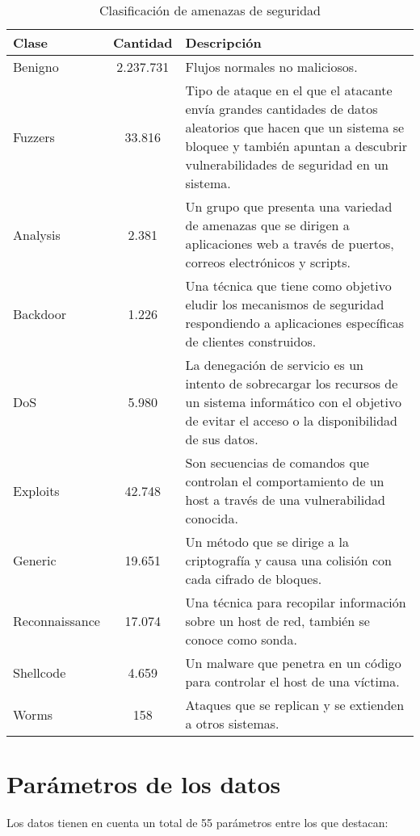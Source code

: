 \begin{table}[H]
\label{tab:attacks-tab}
\begin{tabular}{|l|c|>{\RaggedRight}p{10cm}|} %
\hline
\rowcolor[HTML]{C0C0C0} 
\textbf{Clase} & \textbf{Cantidad} & \textbf{Descripción} \\ \hline
Benigno & 2.237.731 & Flujos normales no maliciosos. \\ \hline
Fuzzers & 33.816 & Tipo de ataque en el que el atacante envía grandes cantidades de datos aleatorios que hacen que un sistema se bloquee y también apuntan a descubrir vulnerabilidades de seguridad en un sistema. \\ \hline
Analysis & 2.381 & Un grupo que presenta una variedad de amenazas que se dirigen a aplicaciones web a través de puertos, correos electrónicos y scripts. \\ \hline
Backdoor & 1.226 & Una técnica que tiene como objetivo eludir los mecanismos de seguridad respondiendo a aplicaciones específicas de clientes construidos. \\ \hline
DoS & 5.980 & La denegación de servicio es un intento de sobrecargar los recursos de un sistema informático con el objetivo de evitar el acceso o la disponibilidad de sus datos. \\ \hline
Exploits & 42.748 & Son secuencias de comandos que controlan el comportamiento de un host a través de una vulnerabilidad conocida. \\ \hline
Generic & 19.651 & Un método que se dirige a la criptografía y causa una colisión con cada cifrado de bloques. \\ \hline
Reconnaissance & 17.074 & Una técnica para recopilar información sobre un host de red, también se conoce como sonda. \\ \hline
Shellcode & 4.659 & Un malware que penetra en un código para controlar el host de una víctima. \\ \hline
Worms & 158 & Ataques que se replican y se extienden a otros sistemas. \\ \hline
\end{tabular}
\centering
\caption{Clasificación de amenazas de seguridad}
\end{table}

\section{Parámetros de los datos}

Los datos tienen en cuenta un total de 55 parámetros entre los que destacan:

